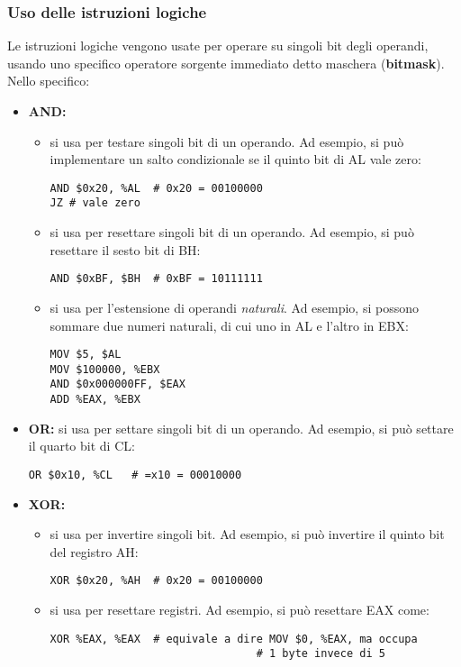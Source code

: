 \documentclass[a4paper,11pt]{article}
\begin{document}
\subsubsection{Uso delle istruzioni logiche}
Le istruzioni logiche vengono usate per operare su singoli bit degli operandi, usando uno specifico operatore sorgente immediato detto maschera (\textbf{bitmask}).
Nello specifico:
\begin{itemize}
	\item \textbf{AND:} 
		\begin{itemize}
			\item si usa per testare singoli bit di un operando.
			Ad esempio, si può implementare un salto condizionale se il quinto bit di AL vale zero:
			\begin{lstlisting}[style=codestyle]	
AND $0x20, %AL	# 0x20 = 00100000
JZ # vale zero
\end{lstlisting} 
			\item si usa per resettare singoli bit di un operando.
			Ad esempio, si può resettare il sesto bit di BH:
			\begin{lstlisting}[style=codestyle]	
AND $0xBF, $BH	# 0xBF = 10111111
\end{lstlisting}
			\item si usa per l'estensione di operandi \textit{naturali}.
				Ad esempio, si possono sommare due numeri naturali, di cui uno in AL e l'altro in EBX:
				\begin{lstlisting}[style=codestyle]	
MOV $5, $AL
MOV $100000, %EBX
AND $0x000000FF, $EAX
ADD %EAX, %EBX	
\end{lstlisting}
		\end{itemize} 
	\item \textbf{OR:} si usa per settare singoli bit di un operando.
		Ad esempio, si può settare il quarto bit di CL:
		\begin{lstlisting}[style=codestyle]	
OR $0x10, %CL	# =x10 = 00010000
\end{lstlisting}
	\item \textbf{XOR:}
		\begin{itemize}
			\item si usa per invertire singoli bit.
		Ad esempio, si può invertire il quinto bit del registro AH:
		\begin{lstlisting}[style=codestyle]	
XOR $0x20, %AH	# 0x20 = 00100000
\end{lstlisting}
	\item si usa per resettare registri.
		Ad esempio, si può resettare EAX come:
		\begin{lstlisting}[language, style=codestyle]	
XOR %EAX, %EAX	# equivale a dire MOV $0, %EAX, ma occupa 
								# 1 byte invece di 5
\end{lstlisting}
		\end{itemize}
\end{itemize}
\end{document}
